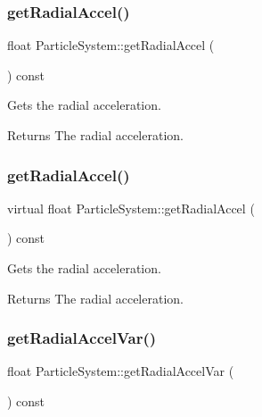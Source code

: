 \subsubsection{\texorpdfstring{get\+Radial\+Accel()}{getRadialAccel()}\hspace{0.1cm}{\footnotesize\ttfamily [1/2]}}
{\footnotesize\ttfamily float Particle\+System\+::get\+Radial\+Accel (\begin{DoxyParamCaption}{ }\end{DoxyParamCaption}) const\hspace{0.3cm}{\ttfamily [virtual]}}

Gets the radial acceleration.

\begin{DoxyReturn}{Returns}
The radial acceleration. 
\end{DoxyReturn}
\mbox{\label{classParticleSystem_a44c1be4035031904d90044a82227f592}} 
\subsubsection{\texorpdfstring{get\+Radial\+Accel()}{getRadialAccel()}\hspace{0.1cm}{\footnotesize\ttfamily [2/2]}}
{\footnotesize\ttfamily virtual float Particle\+System\+::get\+Radial\+Accel (\begin{DoxyParamCaption}{ }\end{DoxyParamCaption}) const\hspace{0.3cm}{\ttfamily [virtual]}}

Gets the radial acceleration.

\begin{DoxyReturn}{Returns}
The radial acceleration. 
\end{DoxyReturn}
\mbox{\label{classParticleSystem_acbdbf0d79ca1bd80fa55a69dcadbfa02}} 
\subsubsection{\texorpdfstring{get\+Radial\+Accel\+Var()}{getRadialAccelVar()}\hspace{0.1cm}{\footnotesize\ttfamily [1/2]}}
{\footnotesize\ttfamily float Particle\+System\+::get\+Radial\+Accel\+Var (\begin{DoxyParamCaption}{ }\end{DoxyParamCaption}) const\hspace{0.3cm}{\ttfamily [virtual]}}

